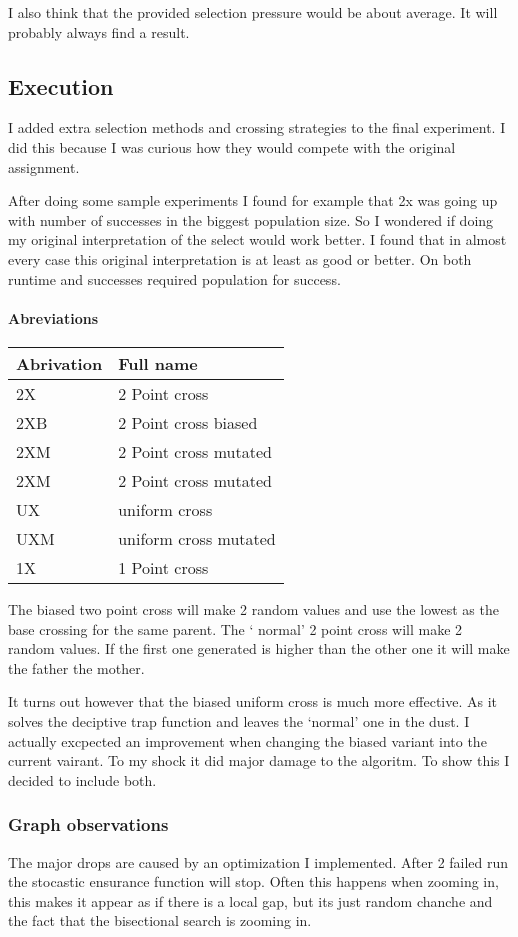 \documentclass{article}
\begin{document}
\begin{empfile}
I also think that the provided selection pressure would be about
average. It will probably always find a result.
\subsection{Execution}
I added extra selection methods and crossing strategies to
the final experiment. I did this because I was curious how they would
compete with the original assignment.

After doing some sample experiments I found for example that 2x was going
up with number of successes in the biggest population size. So I wondered 
if doing my original interpretation of the select would work better.
I found that in almost every case this original interpretation is at least as
good or better. On both runtime and successes required population for success.


\paragraph{Abreviations}
\begin{tabular}{ll}
	Abrivation & Full name \\ \toprule
	2X & 2 Point cross \\
	2XB & 2 Point cross biased \\
	2XM & 2 Point cross mutated \\
	2XM & 2 Point cross mutated \\
	UX & uniform cross \\
	UXM & uniform cross mutated \\
	1X & 1 Point cross \\ \bottomrule
\end{tabular}

The biased two point cross will make 2 random values and use the lowest as
the base crossing for the same parent. The ` normal' 2 point cross will make
2 random values. If the first one generated is higher than the other one it
will make the father the mother.

It turns out however that the biased uniform cross is much more effective.
As it solves the deciptive trap function and leaves the `normal' one in
the dust. I actually excpected an improvement when changing the biased
variant into the current vairant. To my shock it did major damage to the
algoritm. To show this I decided to include both.

\subsubsection{Graph observations}
The major drops are caused by an optimization I implemented. After 2 failed
run the stocastic ensurance function will stop. Often this happens when
zooming in, this makes it appear as if there is a local gap, but its just
random chanche and the fact that the bisectional search is zooming in.


\end{empfile}
\end{document}
